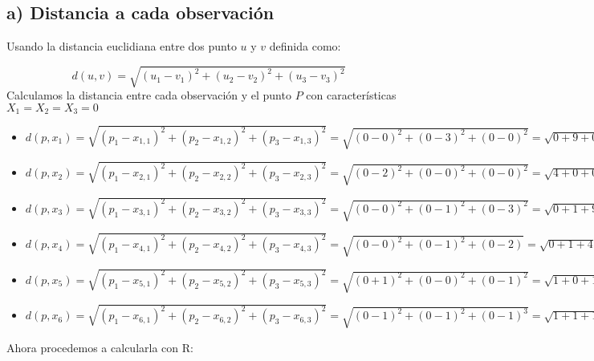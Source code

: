 \documentclass[
  12pt,
  letterpaper,
]{article}
\begin{document}
\subsection{a) Distancia a cada observación}

Usando la distancia euclidiana entre dos punto \(u\) y \(v\) definida
como:

\[d(u, v) = \sqrt{(u_1- v_1)^2+(u_2-v_2)^2+(u_3-v_3)^2}\] Calculamos la
distancia entre cada observación y el punto \(P\) con características
\(X_1 = X_2 = X_3 = 0\)

\begin{itemize}
\item
  \(d(p, x_1) = \sqrt{(p_1- x_{1,1})^2+(p_2-x_{1,2})^2+(p_3-x_{1,3})^2} = \sqrt{(0-0)^2 + (0-3)^2 +(0-0)^2} = \sqrt{0 + 9 + 0} = \sqrt{9} = 3\)
\item
  \(d(p, x_2) = \sqrt{(p_1- x_{2,1})^2+(p_2-x_{2,2})^2+(p_3-x_{2,3})^2} = \sqrt{(0-2)^2 + (0-0)^2 + (0-0)^2} = \sqrt{4 + 0 + 0} = \sqrt{4} = 2\)
\item
  \(d(p, x_3) = \sqrt{(p_1- x_{3,1})^2+(p_2-x_{3,2})^2+(p_3-x_{3,3})^2} = \sqrt{(0-0)^2 + (0-1)^2 + (0-3)^2} = \sqrt{0 + 1 + 9} = \sqrt{10} = 3.162278\)
\item
  \(d(p, x_4) = \sqrt{(p_1- x_{4,1})^2+(p_2-x_{4,2})^2+(p_3-x_{4,3})^2} = \sqrt{(0-0)^2 + (0-1)^2 + (0-2)} = \sqrt{0 + 1 + 4} = \sqrt{5} = 2.236068\)
\item
  \(d(p, x_5) = \sqrt{(p_1- x_{5,1})^2+(p_2-x_{5,2})^2+(p_3-x_{5,3})^2} = \sqrt{(0+1)^2 + (0-0)^2 + (0-1)^2} = \sqrt{1 + 0 + 1} = \sqrt{2} = 1.414214\)
\item
  \(d(p, x_6) = \sqrt{(p_1- x_{6,1})^2+(p_2-x_{6,2})^2+(p_3-x_{6,3})^2} = \sqrt{(0-1)^2 + (0-1)^2 + (0-1)^3} = \sqrt{1 + 1 +1} = \sqrt{3} = 1.732051\)
\end{itemize}

Ahora procedemos a calcularla con R:
\end{document}
